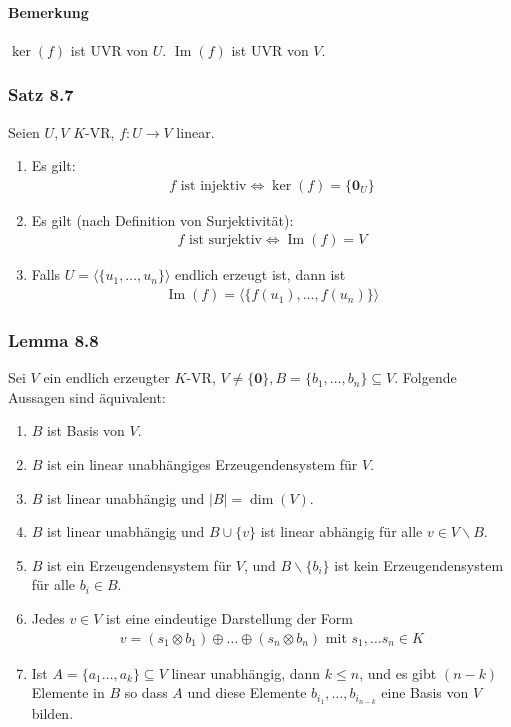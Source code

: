 \documentclass[a5paper, 10pt]{book}
\DeclareMathOperator{\romanIm}{Im}
\newcommand{\lincombine}[4]{(#1_{#3} \circlecdot #2_{#3}) \circleplus \dots \circleplus (#1_{#4} \circlecdot #2_{#4})}%
\newcommand{\circleplus}{\oplus}%
\newcommand{\circlecdot}{\otimes}%
\newcommand{\boldzero}{\mathbf{0}}
\begin{document}
				\paragraph{Bemerkung} $\ker(f)$ ist UVR von $U$. $\romanIm(f)$ ist UVR von $V$.
				
			\subsubsection{Satz 8.7}
				Seien $U, V$ $K$-VR, $f: U \to V$ linear.
				\begin{enumerate}
					\item Es gilt:
						\begin{align}
							f \text{ ist injektiv} \Longleftrightarrow \ker(f) = \{\boldzero_U\}
						\end{align}
					\item Es gilt (nach Definition von Surjektivität):
						\begin{align}
							f \text{ ist surjektiv} \Longleftrightarrow \romanIm(f) = V
						\end{align}
					\item Falls $U = \langle \{u_1, \dots, u_n\} \rangle$ endlich erzeugt ist, dann ist
					\begin{align}
						\romanIm(f) = \langle \{f(u_1), \dots, f(u_n) \} \rangle
					\end{align}
				\end{enumerate}
			
			\subsubsection{Lemma 8.8}
				Sei $V$ ein endlich erzeugter $K$-VR, $V\neq \{\boldzero\}, B = \{b_1, \dots, b_n\} \subseteq V$. Folgende Aussagen sind äquivalent:
				\begin{enumerate}
					\item $B$ ist Basis von $V$.
					\item $B$ ist ein linear unabhängiges Erzeugendensystem für $V$.
					\item $B$ ist linear unabhängig und $|B| = \dim(V)$.
					\item $B$ ist linear unabhängig und $B \cup \{v\}$ ist linear abhängig für alle $v \in V \backslash B$.
					\item $B$ ist ein Erzeugendensystem für $V$, und $B \backslash \{b_i\}$ ist kein Erzeugendensystem für alle $b_i \in B$.
					\item Jedes $v\in V$ ist eine eindeutige Darstellung der Form 
					\begin{align}
						v = \lincombine{s}{b}{1}{n} \text{ mit } s_1, \dots s_n \in K
					\end{align}
					\item Ist $A = \{a_1 \dots, a_k\} \subseteq V$ linear unabhängig, dann $k \leq n$, und es gibt $(n-k)$ Elemente in $B$ so dass $A$ und diese Elemente $b_{i_1}, \dots, b_{i_{n-k}}$ eine Basis von $V$ bilden.
				\end{enumerate}
			
\end{document}
